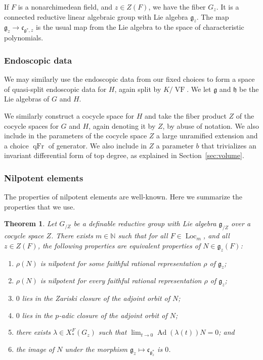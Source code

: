 \documentclass[12pt]{amsart}
\newcommand{\op}[1]{\operatorname{#1}}
\newcommand{\ring}[1]{{\mathbb #1}}
\def\VF{{\op{VF}}}
\newcommand{\fg}{\mathfrak{g}}
\newcommand{\fc}{\mathfrak{c}}
\newcommand{\fh}{\mathfrak{h}}
\theoremstyle{plain}
\newtheorem{theorem}[thm]{Theorem}
\theoremstyle{definition}
\begin{document}
If $F$ is a nonarchimedean field, and $z\in Z(F)$, we have the fiber
$G_z$.  It is a connected reductive linear algebraic group with Lie
algebra $\fg_z$.  The map $\fg_z\to \fc_{\fg^{*},z}$ is the usual map
from the Lie algebra to the space of characteristic polynomials.

\subsubsection{Endoscopic data}

We may similarly use the endoscopic data from our fixed choices to form
a space of quasi-split endoscopic data for $H$, again split by $K/\VF$.  
We let $\fg$ and $\fh$ be the Lie algebras of $G$ and $H$.

We
similarly construct a cocycle space for $H$ and take the fiber product
$Z$ of the cocycle spaces for $G$ and $H$, again denoting it by $Z$,
by abuse of notation.  We also include in the parameters of
the cocycle space $Z$ a large unramified extension and a choice
$\op{qFr}$ of generator.
We also
include in $Z$ a parameter $b$ that trivializes an invariant
differential form of top degree, as explained in Section~\ref{sec:volume}.




\subsubsection{Nilpotent elements}\label{sec:nilpotent}

The properties of nilpotent elements are well-known.  Here we
summarize the properties that we use.

\begin{theorem} 
  Let $G_{/Z}$ be a definable reductive group with Lie algebra
  $\fg_{/Z}$ over a cocycle space $Z$.  There exists $m\in\ring{N}$
  such that for all $F\in\op{Loc}_m$, and all $z\in Z(F)$, the
  following properties are equivalent properties of $N\in \fg_z(F)$:
\begin{enumerate}
\item $\rho(N)$ is nilpotent for {\it some} faithful rational
  representation $\rho$ of $\fg_z$;
\item $\rho(N)$ is nilpotent for {\it every} faithful rational
  representation $\rho$ of $\fg_z$;
\item $0$ lies in the Zariski closure of the adjoint orbit of $N$;
\item $0$ lies in the $p$-adic closure of the adjoint orbit of $N$;
\item there exists $\lambda\in X_*^F(G_z)$ such that $\lim_{t\to 0}
  \op{Ad}(\lambda(t))N = 0$; and
\item the image of $N$ under the morphism $\fg_z\mapsto \fc_{\fg^*_z}$
  is $0$.
\end{enumerate}
\end{theorem}
\end{document}
